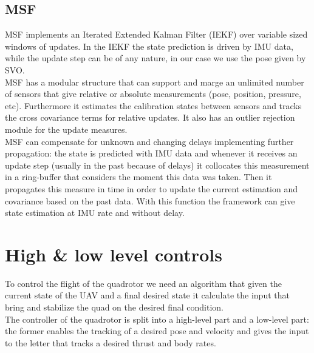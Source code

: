 


\subsection{MSF}
MSF implements an Iterated Extended Kalman Filter (IEKF) \cite{bell1993iterated} over variable sized windows of updates. In the IEKF  the state prediction is driven by IMU data, while the update step can be of any nature, in our case we use the pose given by SVO.\\
MSF has a modular structure that can support and marge an unlimited number of sensors that give relative or absolute measurements (pose, position, pressure, etc). Furthermore it estimates the calibration states between sensors and tracks the cross covariance terms for relative updates. It also has an outlier rejection module for the update measures.\\
MSF can compensate for unknown and changing delays implementing further propagation: the state is predicted with IMU data and whenever it receives an update step (usually in the past because of delays) it collocates this measurement in a ring-buffer that considers the moment this data was taken. Then it propagates this measure in time in order to update the current estimation and covariance based on the past data. With this function the framework can give state estimation at IMU rate and without delay.


\section{High \& low level controls}
To control the flight of the quadrotor we need an algorithm that given the current state of the UAV and a final desired state it calculate the input that bring and stabilize the quad on the desired final condition.\\
The controller of the quadrotor is split into a high-level part and a low-level part: the former enables the tracking of a desired  pose and velocity and gives the input to the letter that tracks a desired thrust and body rates.\\

